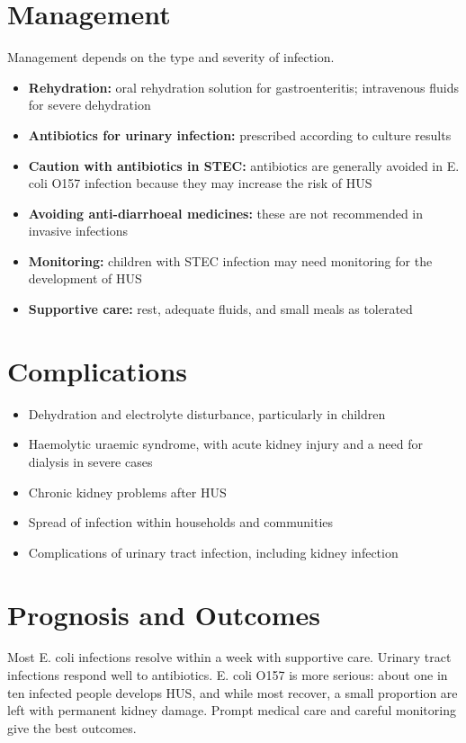 \section*{Management}
Management depends on the type and severity of infection.
\begin{itemize}
    \item \textbf{Rehydration:} oral rehydration solution for gastroenteritis; intravenous fluids for severe dehydration
    \item \textbf{Antibiotics for urinary infection:} prescribed according to culture results
    \item \textbf{Caution with antibiotics in STEC:} antibiotics are generally avoided in E. coli O157 infection because they may increase the risk of HUS
    \item \textbf{Avoiding anti-diarrhoeal medicines:} these are not recommended in invasive infections
    \item \textbf{Monitoring:} children with STEC infection may need monitoring for the development of HUS
    \item \textbf{Supportive care:} rest, adequate fluids, and small meals as tolerated
\end{itemize}

\section*{Complications}
\begin{itemize}
    \item Dehydration and electrolyte disturbance, particularly in children
    \item Haemolytic uraemic syndrome, with acute kidney injury and a need for dialysis in severe cases
    \item Chronic kidney problems after HUS
    \item Spread of infection within households and communities
    \item Complications of urinary tract infection, including kidney infection
\end{itemize}

\section*{Prognosis and Outcomes}
Most E. coli infections resolve within a week with supportive care. Urinary tract infections respond well to antibiotics. E. coli O157 is more serious: about one in ten infected people develops HUS, and while most recover, a small proportion are left with permanent kidney damage. Prompt medical care and careful monitoring give the best outcomes.

